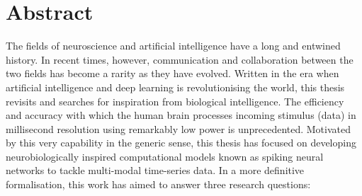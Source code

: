 %
\chapter*{Abstract}

\label{sec:abstract}
\vspace*{-12mm}

The fields of neuroscience and artificial intelligence have a long and entwined history. In recent times, however, communication and collaboration between the two fields has become a rarity as they have evolved. Written in the era when artificial intelligence and deep learning is revolutionising the world, this thesis revisits and searches for inspiration from biological intelligence. The efficiency and accuracy with which the human brain processes incoming stimulus (data) in millisecond resolution using remarkably low power is unprecedented. Motivated by this very capability in the generic sense, this thesis has focused on developing neurobiologically inspired computational models known as spiking neural networks to tackle multi-modal time-series data. In a more definitive formalisation, this work has aimed to answer three research questions:
